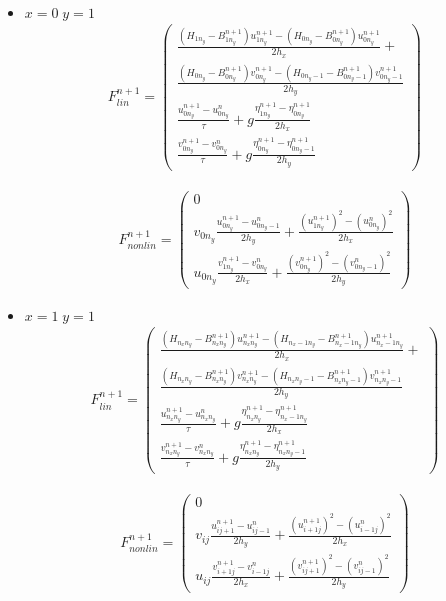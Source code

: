 \begin{itemize}
    \item $x=0\;y=1$
	\begin{eqnarray*}
	    F^{n+1}_{lin}=\begin{pmatrix}
		\frac{(H_{1n_{y}}-B_{1n_{y}}^{n+1})u_{1n_{y}}^{n+1}-(H_{0n_{y}}-B_{0n_{y}}^{n+1})u_{0n_{y}}^{n+1}}{2h_x}+\\
		\frac{(H_{0n_{y}}-B_{0n_{y}}^{n+1})v_{0n_{y}}^{n+1}-(H_{0n_{y}-1}-B_{0n_{y}-1}^{n+1})v_{0n_{y}-1}^{n+1}}{2h_y}\\
		\frac{u_{0n_{y}}^{n+1}-u_{0n_{y}}^{n}}{\tau}+
		g\frac{\eta_{1n_{y}}^{n+1}-\eta_{0n_{y}}^{n+1}}{2h_x}\\
		\frac{v_{0n_{y}}^{n+1}-v_{0n_{y}}^{n}}{\tau}+
		g\frac{\eta_{0n_{y}}^{n+1}-\eta_{0n_{y}-1}^{n+1}}{2h_y}
	    \end{pmatrix}
	\end{eqnarray*}

	\begin{eqnarray*}
	    F^{n+1}_{nonlin}=\begin{pmatrix}
		0\\
		v_{0n_{y}}\frac{u_{0n_{y}}^{n+1}-u_{0n_{y}-1}^{n}}{2h_y}+
		\frac{(u_{1n_{y}}^{n+1})^2-(u_{0n_{y}}^{n})^2}{2h_x}\\
		u_{0n_{y}}\frac{v_{1n_{y}}^{n+1}-v_{0n_{y}}^{n}}{2h_x}+
		\frac{(v_{0n_{y}}^{n+1})^2-(v_{0n_{y}-1}^{n})^2}{2h_y}
	    \end{pmatrix}
	\end{eqnarray*}

    \item $x=1\;y=1$
	\begin{eqnarray*}
	    F^{n+1}_{lin}=\begin{pmatrix}
		\frac{(H_{n_{x}n_{y}}-B_{n_{x}n_{y}}^{n+1})u_{n_{x}n_{y}}^{n+1}-(H_{n_{x}-1n_{y}}-B_{n_{x}-1n_{y}}^{n+1})u_{n_{x}-1n_{y}}^{n+1}}{2h_x}+\\
		\frac{(H_{n_{x}n_{y}}-B_{n_{x}n_{y}}^{n+1})v_{n_{x}n_{y}}^{n+1}-(H_{n_{x}n_{y}-1}-B_{n_{x}n_{y}-1}^{n+1})v_{n_{x}n_{y}-1}^{n+1}}{2h_y}\\
		\frac{u_{n_{x}n_{y}}^{n+1}-u_{n_{x}n_{y}}^{n}}{\tau}+
		g\frac{\eta_{n_{x}n_{y}}^{n+1}-\eta_{n_{x}-1n_{y}}^{n+1}}{2h_x}\\
		\frac{v_{n_{x}n_{y}}^{n+1}-v_{n_{x}n_{y}}^{n}}{\tau}+
		g\frac{\eta_{n_{x}n_{y}}^{n+1}-\eta_{n_{x}n_{y}-1}^{n+1}}{2h_y}
	    \end{pmatrix}
	\end{eqnarray*}

	\begin{eqnarray*}
	    F^{n+1}_{nonlin}=\begin{pmatrix}
		0\\
		v_{ij}\frac{u_{ij+1}^{n+1}-u_{ij-1}^{n}}{2h_y}+
		\frac{(u_{i+1j}^{n+1})^2-(u_{i-1j}^{n})^2}{2h_x}\\
		u_{ij}\frac{v_{i+1j}^{n+1}-v_{i-1j}^{n}}{2h_x}+
		\frac{(v_{ij+1}^{n+1})^2-(v_{ij-1}^{n})^2}{2h_y}
	    \end{pmatrix}
	\end{eqnarray*}

\end{itemize}

